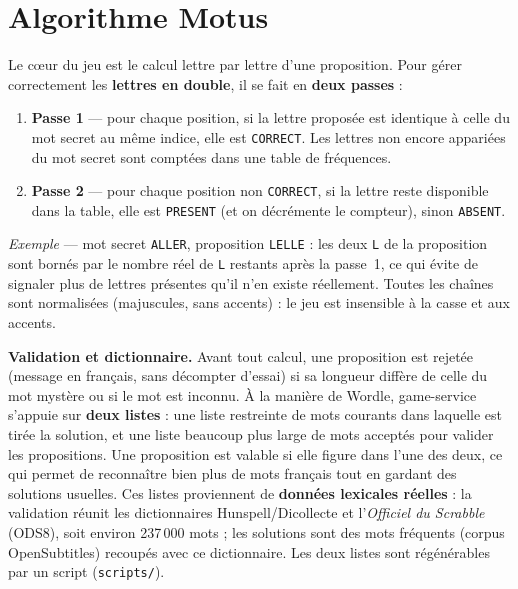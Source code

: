 \documentclass[11pt,a4paper]{article}
\begin{document}
\section{Algorithme Motus}
Le cœur du jeu est le calcul lettre par lettre d'une proposition. Pour gérer
correctement les \textbf{lettres en double}, il se fait en \textbf{deux passes} :

\begin{enumerate}[leftmargin=1.4em, itemsep=1pt, topsep=2pt]
  \item \textbf{Passe 1} — pour chaque position, si la lettre proposée est identique à
        celle du mot secret au même indice, elle est \texttt{CORRECT}. Les lettres non
        encore appariées du mot secret sont comptées dans une table de fréquences.
  \item \textbf{Passe 2} — pour chaque position non \texttt{CORRECT}, si la lettre reste
        disponible dans la table, elle est \texttt{PRESENT} (et on décrémente le compteur),
        sinon \texttt{ABSENT}.
\end{enumerate}

\textit{Exemple} — mot secret \texttt{ALLER}, proposition \texttt{LELLE} :
les deux \texttt{L} de la proposition sont bornés par le nombre réel de \texttt{L}
restants après la passe~1, ce qui évite de signaler plus de lettres présentes qu'il
n'en existe réellement. Toutes les chaînes sont normalisées (majuscules, sans accents) :
le jeu est insensible à la casse et aux accents.

\textbf{Validation et dictionnaire.} Avant tout calcul, une proposition est rejetée
(message en français, sans décompter d'essai) si sa longueur diffère de celle du mot
mystère ou si le mot est inconnu. À la manière de Wordle, game-service s'appuie sur
\textbf{deux listes} : une liste restreinte de mots courants dans laquelle est tirée la
solution, et une liste beaucoup plus large de mots acceptés pour valider les
propositions. Une proposition est valable si elle figure dans l'une des deux, ce qui
permet de reconnaître bien plus de mots français tout en gardant des solutions usuelles.
Ces listes proviennent de \textbf{données lexicales réelles} : la validation réunit les
dictionnaires Hunspell/Dicollecte et l'\textit{Officiel du Scrabble} (ODS8), soit environ
237\,000 mots ; les solutions sont des mots fréquents (corpus OpenSubtitles) recoupés avec
ce dictionnaire. Les deux listes sont régénérables par un script (\texttt{scripts/}).
\end{document}
